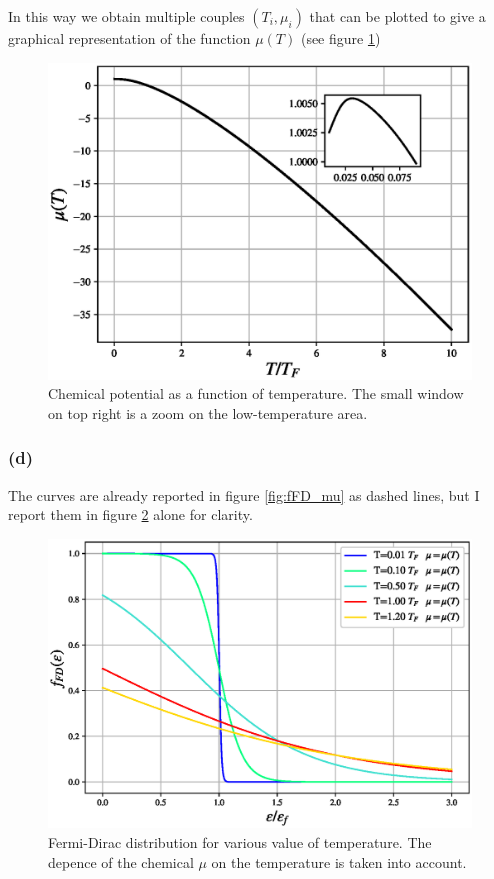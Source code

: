 \documentclass{article}
\begin{document}
In this way we obtain multiple couples $(T_i, \mu_i)$ that can be plotted to give a graphical representation of the function $\mu(T)$ (see figure \ref{fig:chemical_potential})
\begin{figure}[hbtp]
    \centering 
    \includegraphics[scale=0.7]{scripts/mu_T.eps}
    \caption{Chemical potential as a function of temperature. The small window on top right is a zoom on the low-temperature area.}
    \label{fig:chemical_potential}
\end{figure}

\subsubsection*{(d)}
The curves are already reported in figure \ref{fig:fFD_mu} as dashed lines, but I report them in figure \ref{fig:fFD_mu_T} alone for clarity.
\begin{figure}[htbpb]
    \centering
    \includegraphics[scale=0.5]{scripts/f_fd_mu_T.eps}
    \caption{Fermi-Dirac distribution for various value of temperature. The depence of the chemical $\mu$ on the temperature is taken into account.}
    \label{fig:fFD_mu_T}
\end{figure}
\end{document}
